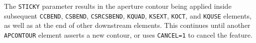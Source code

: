 The \verb|STICKY| parameter results in the aperture contour being applied inside subsequent \verb|CCBEND|,
\verb|CSBEND|, \verb|CSRCSBEND|, \verb|KQUAD|, \verb|KSEXT|, \verb|KOCT|, and \verb|KQUSE| elements, as well as at the
end of other downstream elements. This continues until another \verb|APCONTOUR| element asserts a new contour, or uses
\verb|CANCEL=1| to cancel the feature.
